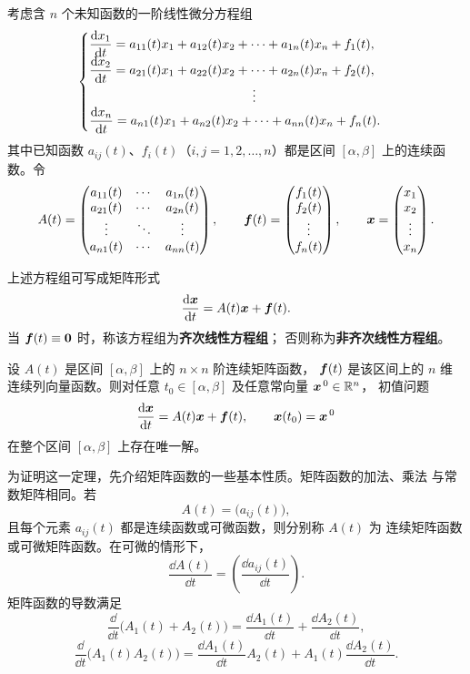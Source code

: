 考虑含 $n$ 个未知函数的一阶线性微分方程组
\[
	\begin{cases}
		\dfrac{\dd x_1}{\dd t}
		=a_{11}(t)x_1+a_{12}(t)x_2+\cdots+a_{1n}(t)x_n+f_1(t),\\
		\dfrac{\dd x_2}{\dd t}
		=a_{21}(t)x_1+a_{22}(t)x_2+\cdots+a_{2n}(t)x_n+f_2(t),\\
		\hspace{4.5cm}\vdots\\
		\dfrac{\dd x_n}{\dd t}
		=a_{n1}(t)x_1+a_{n2}(t)x_2+\cdots+a_{nn}(t)x_n+f_n(t).
	\end{cases}
\]
其中已知函数 $a_{ij}(t)$、$f_i(t)$（$i,j=1,2,\ldots,n$）都是区间
$[\alpha,\beta]$ 上的连续函数。令
\[
	A(t)=
	\begin{pmatrix}
		a_{11}(t) & \cdots & a_{1n}(t)\\
		a_{21}(t) & \cdots & a_{2n}(t)\\
		\vdots    & \ddots & \vdots\\
		a_{n1}(t) & \cdots & a_{nn}(t)
	\end{pmatrix},
	\qquad
	\boldsymbol{f}(t)=
	\begin{pmatrix}
		f_1(t)\\
		f_2(t)\\
		\vdots\\
		f_n(t)
	\end{pmatrix},
	\qquad
	\boldsymbol{x}=
	\begin{pmatrix}
		x_1\\
		x_2\\
		\vdots\\
		x_n
	\end{pmatrix}.
\]
\begin{definition}\label{def:齐次与非齐次线性方程组}
	上述方程组可写成矩阵形式
\[
	\dfrac{\mathrm{d} \boldsymbol{x}}{\mathrm{d} t}
	=A(t)\boldsymbol{x}+\boldsymbol{f}(t).
\]
当 $\boldsymbol{f}(t)\equiv\boldsymbol{0}$ 时，称该方程组为\textbf{齐次线性方程组}；
否则称为\textbf{非齐次线性方程组}。

\end{definition}
\begin{theorem}\label{thm:线性方程组的存在唯一性}
	设 $A(t)$ 是区间 $[\alpha,\beta]$ 上的 $n\times n$ 阶连续矩阵函数，
	$\boldsymbol{f}(t)$ 是该区间上的 $n$ 维连续列向量函数。则对任意
	$t_0\in[\alpha,\beta]$ 及任意常向量 $\boldsymbol{x}^{\,0}\in\mathbb{R}^n$，
	初值问题
	\[
		\dfrac{\mathrm{d} \boldsymbol{x}}{\mathrm{d} t}
		=A(t)\boldsymbol{x}+\boldsymbol{f}(t),
		\qquad
		\boldsymbol{x}(t_0)=\boldsymbol{x}^{\,0}
	\]
	在整个区间 $[\alpha,\beta]$ 上存在唯一解。
\end{theorem}

为证明这一定理，先介绍矩阵函数的一些基本性质。矩阵函数的加法、乘法
与常数矩阵相同。若
\[
	A(t)=\bigl(a_{ij}(t)\bigr),
\]
且每个元素 $a_{ij}(t)$ 都是连续函数或可微函数，则分别称 $A(t)$ 为
连续矩阵函数或可微矩阵函数。在可微的情形下，
\[
	\dfrac{\dd A(t)}{\dd t}
	=\left(\dfrac{\dd a_{ij}(t)}{\dd t}\right).
\]
矩阵函数的导数满足
\[
	\dfrac{\dd}{\dd t}\bigl(A_1(t)+A_2(t)\bigr)
	=\dfrac{\dd A_1(t)}{\dd t}
	+\dfrac{\dd A_2(t)}{\dd t},
\]
\[
	\dfrac{\dd}{\dd t}\bigl(A_1(t)A_2(t)\bigr)
	=\dfrac{\dd A_1(t)}{\dd t}A_2(t)
	+A_1(t)\dfrac{\dd A_2(t)}{\dd t}.
\]

